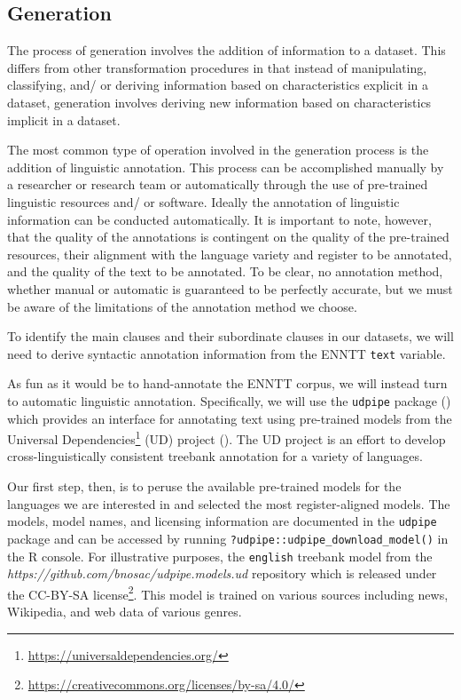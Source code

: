 \documentclass[
  letterpaper,
]{latex/krantz}
\theoremstyle{definition}
\theoremstyle{remark}
\DeclareRobustCommand{\href}[2]{#2\footnote{\url{#1}}}
\begin{document}
\subsection{Generation}\label{sec-td-generation}

The process of generation involves the addition of information to a
dataset. This differs from other transformation procedures in that
instead of manipulating, classifying, and/ or deriving information based
on characteristics explicit in a dataset, generation involves deriving
new information based on characteristics implicit in a dataset.

The most common type of operation involved in the generation process is
the addition of linguistic annotation. This process can be accomplished
manually by a researcher or research team or automatically through the
use of pre-trained linguistic resources and/ or software. Ideally the
annotation of linguistic information can be conducted automatically. It
is important to note, however, that the quality of the annotations is
contingent on the quality of the pre-trained resources, their alignment
with the language variety and register to be annotated, and the quality
of the text to be annotated. To be clear, no annotation method, whether
manual or automatic is guaranteed to be perfectly accurate, but we must
be aware of the limitations of the annotation method we choose.

To identify the main clauses and their subordinate clauses in our
datasets, we will need to derive syntactic annotation information from
the ENNTT \texttt{text} variable.

As fun as it would be to hand-annotate the ENNTT corpus, we will instead
turn to automatic linguistic annotation. Specifically, we will use the
\texttt{udpipe} package () which
provides an interface for annotating text using pre-trained models from
the \href{https://universaldependencies.org/}{Universal Dependencies}
(UD) project (). The UD
project is an effort to develop cross-linguistically consistent treebank
annotation for a variety of languages.

Our first step, then, is to peruse the available pre-trained models for
the languages we are interested in and selected the most
register-aligned models. The models, model names, and licensing
information are documented in the \texttt{udpipe} package and can be
accessed by running \texttt{?udpipe::udpipe\_download\_model()} in the R
console. For illustrative purposes, the \texttt{english} treebank model
from the \emph{https://github.com/bnosac/udpipe.models.ud} repository
which is released under the
\href{https://creativecommons.org/licenses/by-sa/4.0/}{CC-BY-SA
license}. This model is trained on various sources including news,
Wikipedia, and web data of various genres.
\end{document}
